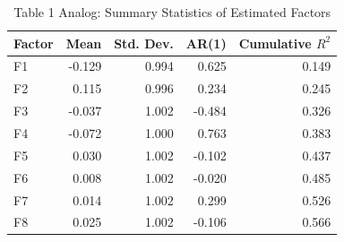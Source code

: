 \begin{table}[htbp]
\centering
\caption{Table 1 Analog: Summary Statistics of Estimated Factors}
\begin{tabular}{lrrrr}\hline
Factor & Mean & Std. Dev. & AR(1) & Cumulative $R^2$\\\hline
F1 & -0.129 & 0.994 & 0.625 & 0.149\\
F2 & 0.115 & 0.996 & 0.234 & 0.245\\
F3 & -0.037 & 1.002 & -0.484 & 0.326\\
F4 & -0.072 & 1.000 & 0.763 & 0.383\\
F5 & 0.030 & 1.002 & -0.102 & 0.437\\
F6 & 0.008 & 1.002 & -0.020 & 0.485\\
F7 & 0.014 & 1.002 & 0.299 & 0.526\\
F8 & 0.025 & 1.002 & -0.106 & 0.566\\
\hline\end{tabular}\end{table}
